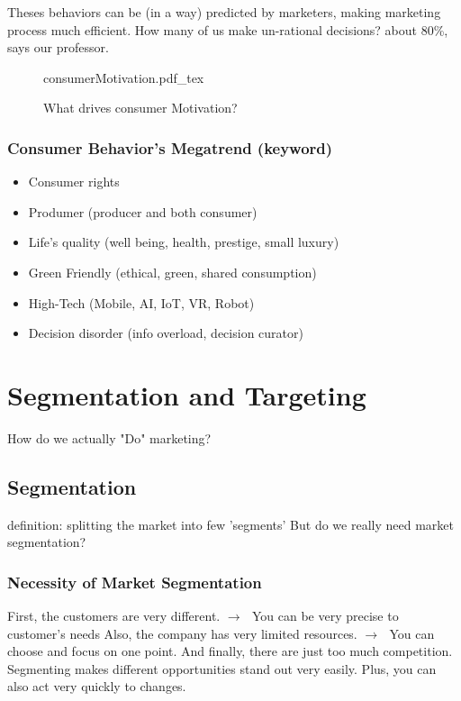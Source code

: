 \documentclass[12pt]{article}
\newcommand{\ra}{$\rightarrow \text{ }$}
\begin{document}
Theses behaviors can be (in a way) predicted by marketers, making marketing process much efficient.
How many of us make un-rational decisions? about 80\%, says our professor.

\begin{figure}[H]
	\centering
	\def\svgwidth{\columnwidth}
	{consumerMotivation.pdf_tex}
	\caption{What drives consumer Motivation?}
	\label{fig:consumerMotivation}
\end{figure}

\subsubsection{Consumer Behavior's Megatrend (keyword)}
\begin{itemize}
	\item Consumer rights
	\item Produmer (producer and both consumer)
	\item Life's quality (well being, health, prestige, small luxury)
	\item Green Friendly (ethical, green, shared consumption)
	\item High-Tech (Mobile, AI, IoT, VR, Robot)
	\item Decision disorder (info overload, decision curator)
\end{itemize}

\section{Segmentation and Targeting}

How do we actually "Do" marketing?

\subsection{Segmentation}

definition: splitting the market into few 'segments'
But do we really need market segmentation?

\subsubsection{Necessity of Market Segmentation}

First, the customers are very different. \ra You can be very precise to customer's needs
Also, the company has very limited resources. \ra You can choose and focus on one point.
And finally, there are just too much competition.
Segmenting makes different opportunities stand out
very easily.
Plus, you can also act very quickly to changes.
\end{document}
